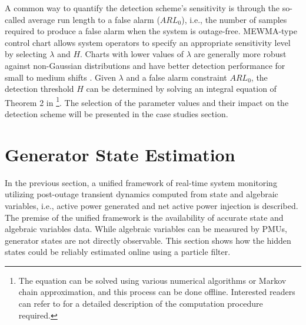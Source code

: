 A common way to quantify the detection scheme's sensitivity is through the so-called average run length to a false alarm ($ARL_0$), i.e., the number of samples required to produce a false alarm when the system is outage-free. MEWMA-type control chart allows system operators to specify an appropriate sensitivity level by selecting $\lambda$ and $H$. Charts with lower values of $\lambda$ are generally more robust against non-Gaussian distributions and have better detection performance for small to medium shifts \cite{montgomery2007introduction}. Given $\lambda$ and a false alarm constraint $ARL_0$, the detection threshold $H$ can be determined by solving an integral equation of Theorem 2 in \cite{rigdon1995integral}\footnote{The equation can be solved using various numerical algorithms or Markov chain approximation, and this process can be done offline. Interested readers can refer to \cite{knoth2017arl} for a detailed description of the computation procedure required.}. The selection of the parameter values and their impact on the detection scheme will be presented in the case studies section. 



\section{Generator State Estimation}
\label{ch4:sec:state_estimation}
In the previous section, a unified framework of real-time system monitoring utilizing post-outage transient dynamics computed from state and algebraic variables, i.e., active power generated and net active power injection is described. The premise of the unified framework is the availability of accurate state and algebraic variables data. While algebraic variables can be measured by PMUs, generator states are not directly observable. This section shows how the hidden states could be reliably estimated online using a particle filter.

